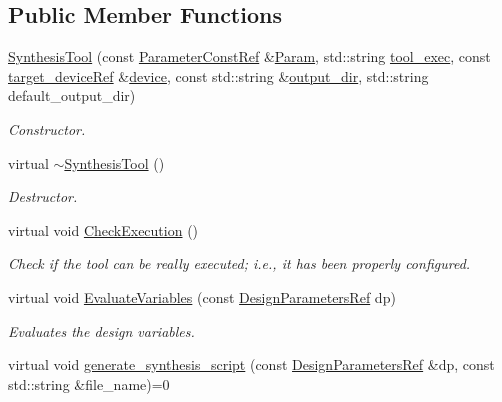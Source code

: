 \subsection*{Public Member Functions}
\begin{DoxyCompactItemize}
\item 
\hyperlink{classSynthesisTool_a2a61e2a0d17d1365585660434ac66107}{Synthesis\+Tool} (const \hyperlink{Parameter_8hpp_a37841774a6fcb479b597fdf8955eb4ea}{Parameter\+Const\+Ref} \&\hyperlink{classSynthesisTool_a854ef102782ff4d069e1aa6d1a94d64e}{Param}, std\+::string \hyperlink{classSynthesisTool_a78fd58496215c69838de4269204804a5}{tool\+\_\+exec}, const \hyperlink{target__device_8hpp_acedb2b7a617e27e6354a8049fee44eda}{target\+\_\+device\+Ref} \&\hyperlink{classSynthesisTool_a07bf37421c6cff80ba70682ea2b2e3ae}{device}, const std\+::string \&\hyperlink{classSynthesisTool_a285793f6f539ed6f049c375cdb68d607}{output\+\_\+dir}, std\+::string default\+\_\+output\+\_\+dir)
\begin{DoxyCompactList}\small\item\em Constructor. \end{DoxyCompactList}\item 
virtual \hyperlink{classSynthesisTool_a69e65e0fed1ddecfe8a501324598cc1c}{$\sim$\+Synthesis\+Tool} ()
\begin{DoxyCompactList}\small\item\em Destructor. \end{DoxyCompactList}\item 
virtual void \hyperlink{classSynthesisTool_ad71ab3aad818780236ad71942de30e47}{Check\+Execution} ()
\begin{DoxyCompactList}\small\item\em Check if the tool can be really executed; i.\+e., it has been properly configured. \end{DoxyCompactList}\item 
virtual void \hyperlink{classSynthesisTool_a4304fdb0a60f1d8da1212568ae3bb031}{Evaluate\+Variables} (const \hyperlink{DesignParameters_8hpp_ae36bb1c4c9150d0eeecfe1f96f42d157}{Design\+Parameters\+Ref} dp)
\begin{DoxyCompactList}\small\item\em Evaluates the design variables. \end{DoxyCompactList}\item 
virtual void \hyperlink{classSynthesisTool_ad62c7c8ec82a58b62ee6ca5325ae8e69}{generate\+\_\+synthesis\+\_\+script} (const \hyperlink{DesignParameters_8hpp_ae36bb1c4c9150d0eeecfe1f96f42d157}{Design\+Parameters\+Ref} \&dp, const std\+::string \&file\+\_\+name)=0

\end{DoxyCompactItemize}

